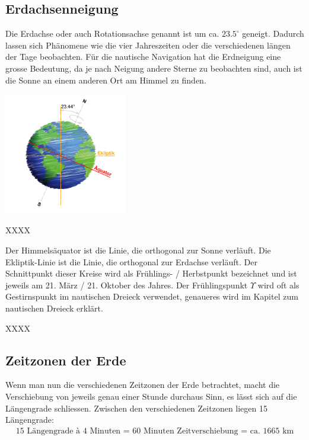 \begin{refsection}
\subsection{Erdachsenneigung}
Die Erdachse oder auch Rotationsachse genannt ist um ca. $23.5^{\circ}$ geneigt.
Dadurch lassen sich Phänomene wie die vier Jahreszeiten oder die verschiedenen längen der Tage beobachten.
Für die nautische Navigation hat die Erdneigung eine grosse Bedeutung, da je nach Neigung andere Sterne zu beobachten sind, auch ist die Sonne an einem anderen Ort am Himmel zu finden.

\begin{center}
        \includegraphics[width=0.4\textwidth]{kugel/Ekliptik.jpg}
\end{center}


XXXX

Der Himmelsäquator ist die Linie, die orthogonal zur Sonne verläuft.
Die Ekliptik-Linie ist die Linie, die orthogonal zur Erdachse verläuft.
Der Schnittpunkt dieser Kreise wird als Frühlings- / Herbstpunkt bezeichnet und ist jeweils am 21. März / 21. Oktober des Jahres.
Der Frühlingspunkt $\Upsilon$ wird oft als Gestirnspunkt im nautischen Dreieck verwendet, genaueres wird im Kapitel zum nautischen Dreieck erklärt.


XXXX

\subsection{Zeitzonen der Erde} \label{Zeitzonen} 
Wenn man nun die verschiedenen Zeitzonen der Erde betrachtet, macht die Verschiebung von jeweils genau einer Stunde durchaus Sinn, es lässt sich auf die Längengrade schliessen.
Zwischen den verschiedenen Zeitzonen liegen 15 Längengrade:
\begin{align*}
\text{15 Längengrade à 4 Minuten = 60 Minuten Zeitverschiebung = ca. 1665 km}
\end{align*}


\end{refsection}
